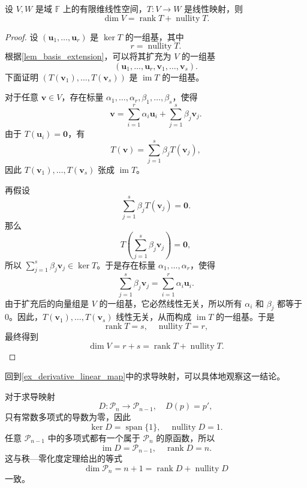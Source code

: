 \begin{theorem}[秩—零化度定理]
    \label{thm_rank_nullity}
    设 \(V,W\) 是域 \(\mathbb F\) 上的有限维线性空间，\(T:V\to W\) 是线性映射，则
    \[
        \dim V=\operatorname{rank}T+\operatorname{nullity}T.
    \]
\end{theorem}
\begin{proof}
    设 \((\bm u_1,\ldots,\bm u_r)\) 是 \(\ker T\) 的一组基，其中
    \[
        r=\operatorname{nullity}T.
    \]
    根据\cref{lem_basis_extension}，可以将其扩充为 \(V\) 的一组基
    \[
        (\bm u_1,\ldots,\bm u_r,\bm v_1,\ldots,\bm v_s).
    \]
    下面证明 \((T(\bm v_1),\ldots,T(\bm v_s))\) 是 \(\operatorname{im}T\) 的一组基。

    对于任意 \(\bm v\in V\)，存在标量 \(\alpha_1,\ldots,\alpha_r,\beta_1,\ldots,\beta_s\)，使得
    \[
        \bm v
        =\sum_{i=1}^{r}\alpha_i\bm u_i
        +\sum_{j=1}^{s}\beta_j\bm v_j.
    \]
    由于 \(T(\bm u_i)=\bm 0\)，有
    \[
        T(\bm v)=\sum_{j=1}^{s}\beta_jT(\bm v_j),
    \]
    因此 \(T(\bm v_1),\ldots,T(\bm v_s)\) 张成 \(\operatorname{im}T\)。

    再假设
    \[
        \sum_{j=1}^{s}\beta_jT(\bm v_j)=\bm 0.
    \]
    那么
    \[
        T\left(\sum_{j=1}^{s}\beta_j\bm v_j\right)=\bm 0,
    \]
    所以 \(\sum_{j=1}^{s}\beta_j\bm v_j\in\ker T\)。于是存在标量 \(\alpha_1,\ldots,\alpha_r\)，使得
    \[
        \sum_{j=1}^{s}\beta_j\bm v_j
        =\sum_{i=1}^{r}\alpha_i\bm u_i.
    \]
    由于扩充后的向量组是 \(V\) 的一组基，它必然线性无关，所以所有 \(\alpha_i\) 和 \(\beta_j\) 都等于 \(0\)。因此，\(T(\bm v_1),\ldots,T(\bm v_s)\) 线性无关，从而构成 \(\operatorname{im}T\) 的一组基。于是
    \[
        \operatorname{rank}T=s,
        \quad
        \operatorname{nullity}T=r,
    \]
    最终得到
    \[
        \dim V=r+s
        =\operatorname{rank}T+\operatorname{nullity}T.
    \]
\end{proof}

回到\cref{ex_derivative_linear_map}中的求导映射，可以具体地观察这一结论。
\begin{example}
    \label{ex_derivative_rank_nullity}
    对于求导映射
    \[
        D:\mathcal P_n\to\mathcal P_{n-1},
        \quad
        D(p)=p',
    \]
    只有常数多项式的导数为零，因此
    \[
        \ker D=\operatorname{span}\{1\},
        \quad
        \operatorname{nullity}D=1.
    \]
    任意 \(\mathcal P_{n-1}\) 中的多项式都有一个属于 \(\mathcal P_n\) 的原函数，所以
    \[
        \operatorname{im}D=\mathcal P_{n-1},
        \quad
        \operatorname{rank}D=n.
    \]
    这与秩—零化度定理给出的等式
    \[
        \dim\mathcal P_n=n+1
        =\operatorname{rank}D+\operatorname{nullity}D
    \]
    一致。
\end{example}

